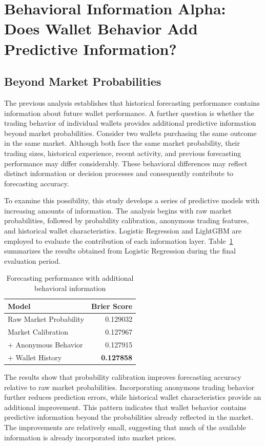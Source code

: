 \section{Behavioral Information Alpha: Does Wallet Behavior Add Predictive Information?}\label{sec:behavior}

\subsection{Beyond Market Probabilities}

The previous analysis establishes that historical forecasting performance contains information about future wallet performance. A further question is whether the trading behavior of individual wallets provides additional predictive information beyond market probabilities. Consider two wallets purchasing the same outcome in the same market. Although both face the same market probability, their trading sizes, historical experience, recent activity, and previous forecasting performance may differ considerably. These behavioral differences may reflect distinct information or decision processes and consequently contribute to forecasting accuracy.

To examine this possibility, this study develops a series of predictive models with increasing amounts of information. The analysis begins with raw market probabilities, followed by probability calibration, anonymous trading features, and historical wallet characteristics. Logistic Regression and LightGBM are employed to evaluate the contribution of each information layer. Table~\ref{tab:logistic} summarizes the results obtained from Logistic Regression during the final evaluation period.

\begin{table}[htbp]
\centering
\caption{Forecasting performance with additional behavioral information}\label{tab:logistic}
\begin{tabular}{lr}
\toprule
Model & Brier Score \\
\midrule
Raw Market Probability & 0.129032 \\
Market Calibration & 0.127967 \\
+ Anonymous Behavior & 0.127915 \\
+ Wallet History & \textbf{0.127858} \\
\bottomrule
\end{tabular}
\end{table}

The results show that probability calibration improves forecasting accuracy relative to raw market probabilities. Incorporating anonymous trading behavior further reduces prediction errors, while historical wallet characteristics provide an additional improvement. This pattern indicates that wallet behavior contains predictive information beyond the probabilities already reflected in the market. The improvements are relatively small, suggesting that much of the available information is already incorporated into market prices.

